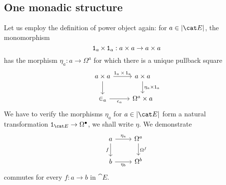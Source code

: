 
\subsection{One monadic structure}

Let us employ the definition of power object again: for \(a \in \abs{\cat E}\), the monomorphism
\[\operatorname{\mathtt 1}_a \times \operatorname{\mathtt 1}_a : a \times a \to a \times a\]
has the morphism \(\eta_a : a \to \Omega^a\) for which there is a unique pullback square
\[\begin{tikzcd}
a \ar[d] \times a \ar["{\id_a \times \id_a}", r] & a \times a \ar["{\eta_a \times \id_a}", d] \\
\in_a \ar["{\epsilon_a}", r, swap] & \Omega^a \times a
\end{tikzcd}\]
We have to verify the morphisms \(\eta_a\) for \(a \in \abs{\cat E}\) form a natural transformation \(\id_{\cat E} \to \Omega^\bullet\), we shall write \(\eta\). We demonstrate 
\[\begin{tikzcd}
a \ar["{\eta_a}", r] \ar["f", d, swap] & \Omega^a \ar["{\Omega^f}", d] \\
b \ar["{\eta_b}", r, swap] & \Omega^b
\end{tikzcd}\]
commutes for every \(f : a \to b\) in \(\cat E\). 

